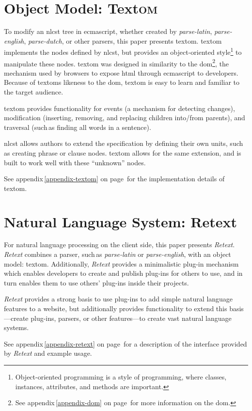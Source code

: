 \section{Object Model: Text\textsc{om}}\label{object-model}

To modify an \gls{nlcst} tree in \gls{ecmascript}, whether created by
  \emph{parse-latin}, \emph{parse-english}, \emph{parse-dutch}, or other
  parsers, this paper presents \gls{textom}.
\gls{textom} implements the nodes defined by \gls{nlcst},
  but provides an object-oriented style\footnote{Object-oriented
    programming is a style of programming, where classes, instances,
    attributes, and methods are important.} to manipulate these nodes.
\gls{textom} was designed in similarity to the \gls{dom}\footnote{See
    appendix\,\ref{appendix-dom} on page\,\pageref{appendix-dom} for more
    information on the \gls{dom}.},
  the mechanism used by browsers to expose \gls{html} through
  \gls{ecmascript} to developers.
Because of \glspl{textom} likeness to the \gls{dom}, \gls{textom} is
  easy to learn and familiar to the target audience.

\gls{textom} provides functionality for events (a mechanism for detecting
  changes), modification (inserting, removing, and replacing children
  into\slash from parents), and traversal (such\,as finding all words in a
  sentence).

\gls{nlcst} allows authors to extend the specification by defining their
  own units, such\,as creating phrase or clause nodes.
\gls{textom} allows for the same extension, and is built to work well
  with these ``unknown'' nodes.

\medskip \noindent See appendix\,\ref{appendix-textom} on
  page\,\pageref{appendix-textom} for the implementation details of
  \gls{textom}.

\section{Natural Language System:
  Retext}\label{natural-language-system-retext}

For natural language processing on the client side, this paper presents
  \emph{Retext}.
\emph{Retext} combines a parser, such\,as \emph{parse-latin} or
  \emph{parse-english}, with an object model: \gls{textom}.
Additionally, \emph{Retext} provides a minimalistic plug-in mechanism which
  enables developers to create and publish plug-ins for others to use, and in
  turn enables them to use others' plug-ins inside their projects.

\emph{Retext} provides a strong basis to use plug-ins to add simple natural
  language features to a website, but additionally provides functionality to
  extend this basis---create plug-ins, parsers, or other features---to
  create vast natural language systems.

\medskip \noindent See appendix\,\ref{appendix-retext} on
  page\,\pageref{appendix-retext} for a description of the interface
  provided by \emph{Retext} and example usage.
